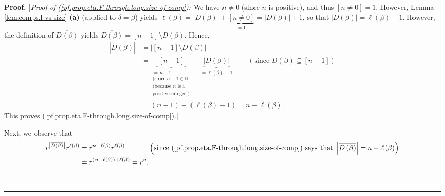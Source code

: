 \documentclass[numbers=enddot,12pt,final,onecolumn,notitlepage]{scrartcl}%
\theoremstyle{definition}
\newenvironment{proof}[1][Proof]{\noindent\textbf{#1.} }{\ \rule{0.5em}{0.5em}}
\newenvironment{verlong}{}{}
\begin{document}
\begin{verlong}
\begin{proof}
[\textit{Proof of (\ref{pf.prop.eta.F-through.long.size-of-comp}):} We have
$n\neq0$ (since $n$ is positive), and thus $\left[  n\neq0\right]  =1$.
However, Lemma \ref{lem.comps.l-vs-size} \textbf{(a)} (applied to
$\delta=\beta$) yields $\ell\left(  \beta\right)  =\left\vert D\left(
\beta\right)  \right\vert +\underbrace{\left[  n\neq0\right]  }_{=1}%
=\left\vert D\left(  \beta\right)  \right\vert +1$, so that $\left\vert
D\left(  \beta\right)  \right\vert =\ell\left(  \beta\right)  -1$. However,
the definition of $\overline{D\left(  \beta\right)  }$ yields $\overline
{D\left(  \beta\right)  }=\left[  n-1\right]  \setminus D\left(  \beta\right)
$. Hence,%
\begin{align*}
\left\vert \overline{D\left(  \beta\right)  }\right\vert  &  =\left\vert
\left[  n-1\right]  \setminus D\left(  \beta\right)  \right\vert \\
&  =\underbrace{\left\vert \left[  n-1\right]  \right\vert }%
_{\substack{=n-1\\\text{(since }n-1\in\mathbb{N}\\\text{(because }n\text{ is
a}\\\text{positive integer))}}}-\underbrace{\left\vert D\left(  \beta\right)
\right\vert }_{=\ell\left(  \beta\right)  -1}\ \ \ \ \ \ \ \ \ \ \left(
\text{since }D\left(  \beta\right)  \subseteq\left[  n-1\right]  \right) \\
&  =\left(  n-1\right)  -\left(  \ell\left(  \beta\right)  -1\right)
=n-\ell\left(  \beta\right)  .
\end{align*}
This proves (\ref{pf.prop.eta.F-through.long.size-of-comp}).]

Next, we observe that%
\begin{align}
r^{\left\vert \overline{D\left(  \beta\right)  }\right\vert }r^{\ell\left(
\beta\right)  }  &  =r^{n-\ell\left(  \beta\right)  }r^{\ell\left(
\beta\right)  }\ \ \ \ \ \ \ \ \ \ \left(  \text{since
(\ref{pf.prop.eta.F-through.long.size-of-comp}) says that }\left\vert
\overline{D\left(  \beta\right)  }\right\vert =n-\ell\left(  \beta\right)
\right) \nonumber\\
&  =r^{\left(  n-\ell\left(  \beta\right)  \right)  +\ell\left(  \beta\right)
}=r^{n}. \label{pf.prop.eta.F-through.long.size-of-comp2}%
\end{align}



\end{proof}
\end{verlong}
\end{document}
